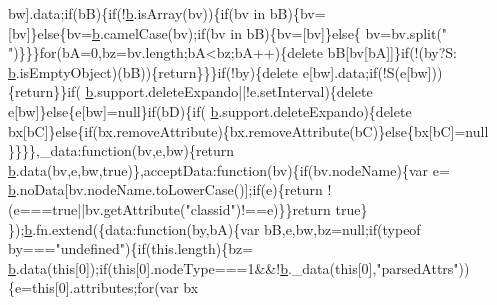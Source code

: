 \begin{DoxyCode}
      bw].data;\textcolor{keywordflow}{if}(bB)\{\textcolor{keywordflow}{if}(!\hyperlink{a00039_aa4026ad5544b958e54ce5e106fa1c805}{b}.isArray(bv))\{\textcolor{keywordflow}{if}(bv in bB)\{bv=[bv]\}\textcolor{keywordflow}{else}\{bv=\hyperlink{a00039_aa4026ad5544b958e54ce5e106fa1c805}{b}.camelCase(bv);\textcolor{keywordflow}{if}(bv in bB)\{bv=[bv]\}\textcolor{keywordflow}{else}\{
      bv=bv.split(\textcolor{stringliteral}{" "})\}\}\}\textcolor{keywordflow}{for}(bA=0,bz=bv.length;bA<bz;bA++)\{\textcolor{keyword}{delete} bB[bv[bA]]\}\textcolor{keywordflow}{if}(!(by?S:
      \hyperlink{a00039_aa4026ad5544b958e54ce5e106fa1c805}{b}.isEmptyObject)(bB))\{\textcolor{keywordflow}{return}\}\}\}\textcolor{keywordflow}{if}(!by)\{\textcolor{keyword}{delete} e[bw].data;\textcolor{keywordflow}{if}(!S(e[bw]))\{\textcolor{keywordflow}{return}\}\}\textcolor{keywordflow}{if}(
      \hyperlink{a00039_aa4026ad5544b958e54ce5e106fa1c805}{b}.support.deleteExpando||!e.setInterval)\{\textcolor{keyword}{delete} e[bw]\}\textcolor{keywordflow}{else}\{e[bw]=null\}\textcolor{keywordflow}{if}(bD)\{\textcolor{keywordflow}{if}(
      \hyperlink{a00039_aa4026ad5544b958e54ce5e106fa1c805}{b}.support.deleteExpando)\{\textcolor{keyword}{delete} bx[bC]\}\textcolor{keywordflow}{else}\{\textcolor{keywordflow}{if}(bx.removeAttribute)\{bx.removeAttribute(bC)\}\textcolor{keywordflow}{else}\{bx[bC]=null
      \}\}\}\},\_data:\textcolor{keyword}{function}(bv,e,bw)\{\textcolor{keywordflow}{return} \hyperlink{a00039_aa4026ad5544b958e54ce5e106fa1c805}{b}.data(bv,e,bw,\textcolor{keyword}{true})\},acceptData:\textcolor{keyword}{function}(bv)\{\textcolor{keywordflow}{if}(bv.nodeName)\{var e=
      \hyperlink{a00039_aa4026ad5544b958e54ce5e106fa1c805}{b}.noData[bv.nodeName.toLowerCase()];\textcolor{keywordflow}{if}(e)\{\textcolor{keywordflow}{return} !(e===\textcolor{keyword}{true}||bv.getAttribute(\textcolor{stringliteral}{"classid"})!==e)\}\}\textcolor{keywordflow}{return} \textcolor{keyword}{true}\}
      \});\hyperlink{a00039_aa4026ad5544b958e54ce5e106fa1c805}{b}.fn.extend(\{data:\textcolor{keyword}{function}(by,bA)\{var bB,e,bw,bz=null;\textcolor{keywordflow}{if}(typeof by===\textcolor{stringliteral}{"undefined"})\{\textcolor{keywordflow}{if}(this.length)\{bz=
      \hyperlink{a00039_aa4026ad5544b958e54ce5e106fa1c805}{b}.data(\textcolor{keyword}{this}[0]);\textcolor{keywordflow}{if}(\textcolor{keyword}{this}[0].nodeType===1&&!\hyperlink{a00039_aa4026ad5544b958e54ce5e106fa1c805}{b}.\_data(\textcolor{keyword}{this}[0],\textcolor{stringliteral}{"parsedAttrs"}))\{e=\textcolor{keyword}{this}[0].attributes;\textcolor{keywordflow}{for}(var bx

\end{DoxyCode}
